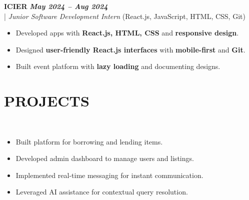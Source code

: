 \documentclass[10pt,a4paper]{article}
\begin{document}
\vspace{5pt}
\noindent
   \textbf{ICIER} \hfill \textit{\textbf{May 2024 -- Aug 2024}} \\
  \;|\;
  \textit{Junior Software Development Intern} (React.js, JavaScript, HTML, CSS, Git)
  \hfill

\begin{itemize}



\item Developed apps with \textbf{React.js, HTML, CSS} and \textbf{responsive design}.



\item Designed \textbf{user-friendly React.js interfaces} with \textbf{mobile-first} and \textbf{Git}.



\item Built event platform with \textbf{lazy loading} and documenting designs.



\end{itemize}
\section*{PROJECTS}
\small

\noindent
{}\\[-12pt]
\begin{itemize}

\item Built platform for borrowing and lending items.

\item Developed admin dashboard to manage users and listings.

\item Implemented real-time messaging for instant communication.

\item Leveraged AI assistance for contextual query resolution.

\end{itemize}
\end{document}
